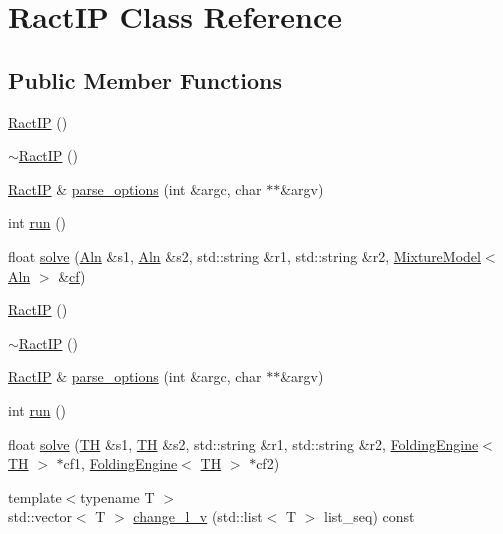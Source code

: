 \hypertarget{class_ract_i_p}{\section{Ract\+I\+P Class Reference}
\label{class_ract_i_p}
}
\subsection*{Public Member Functions}
\begin{DoxyCompactItemize}
\item 
\hyperlink{class_ract_i_p_a84f7d8eba63982d5e3a6e858c76e58d6}{Ract\+I\+P} ()
\item 
\hyperlink{class_ract_i_p_a2f77a89bc806a2fdbfe8ff9987fe81a4}{$\sim$\+Ract\+I\+P} ()
\item 
\hyperlink{class_ract_i_p}{Ract\+I\+P} \& \hyperlink{class_ract_i_p_acfd0432b401128506564f88203d5b4f9}{parse\+\_\+options} (int \&argc, char $\ast$$\ast$\&argv)
\item 
int \hyperlink{class_ract_i_p_a1b9280130942c2ee4fe22ff9288c57fa}{run} ()
\item 
float \hyperlink{class_ract_i_p_a53487d2366928d9665acc8876a734b85}{solve} (\hyperlink{class_aln}{Aln} \&s1, \hyperlink{class_aln}{Aln} \&s2, std\+::string \&r1, std\+::string \&r2, \hyperlink{class_mixture_model}{Mixture\+Model}$<$ \hyperlink{class_aln}{Aln} $>$ \&\hyperlink{notespace_8cpp_ace32c53d52804f2843ccfe220db6038c}{cf})
\item 
\hyperlink{class_ract_i_p_a84f7d8eba63982d5e3a6e858c76e58d6}{Ract\+I\+P} ()
\item 
\hyperlink{class_ract_i_p_a2f77a89bc806a2fdbfe8ff9987fe81a4}{$\sim$\+Ract\+I\+P} ()
\item 
\hyperlink{class_ract_i_p}{Ract\+I\+P} \& \hyperlink{class_ract_i_p_a4c8f919aee61ce0c59b2e55a81c13b53}{parse\+\_\+options} (int \&argc, char $\ast$$\ast$\&argv)
\item 
int \hyperlink{class_ract_i_p_a1b9280130942c2ee4fe22ff9288c57fa}{run} ()
\item 
float \hyperlink{class_ract_i_p_a7c087c762b7265dda0c14af686b7d497}{solve} (\hyperlink{class_t_h}{T\+H} \&s1, \hyperlink{class_t_h}{T\+H} \&s2, std\+::string \&r1, std\+::string \&r2, \hyperlink{class_folding_engine}{Folding\+Engine}$<$ \hyperlink{class_t_h}{T\+H} $>$ $\ast$cf1, \hyperlink{class_folding_engine}{Folding\+Engine}$<$ \hyperlink{class_t_h}{T\+H} $>$ $\ast$cf2)
\item 
{\footnotesize template$<$typename T $>$ }\\std\+::vector$<$ T $>$ \hyperlink{class_ract_i_p_aa34a7edfdf4f33f364dd82fe32b45920}{change\+\_\+l\+\_\+v} (std\+::list$<$ T $>$ list\+\_\+seq) const 
\end{DoxyCompactItemize}
